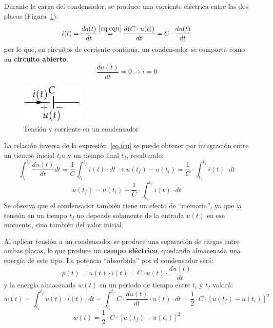 \documentclass[11pt]{book} %
\begin{document}
	Durante la carga del condensador, se produce una corriente eléctrica entre las dos placas (Figura~\ref{fig.condensador}): 
	\begin{equation*}\label{eq.icu}
		i(t)=\dfrac{dq(t)}{dt}\stackrel{\eqref{eq.cqu}}{=}\dfrac{d(C\cdot u(t))}{dt}=C\cdot \dfrac{du(t)}{dt}
	\end{equation*}
	por lo que, en circuitos de corriente continua, un condensador se comporta como un \textbf{circuito abierto}.
	\begin{equation*}
		\frac{du(t)}{dt} = 0 \rightarrow i = 0
	\end{equation*}
	\begin{figure}[htbp]
		\centering
		\includegraphics[width=0.15\linewidth]{../figs/Condensador.pdf}
		\caption{Tensión y corriente en un condensador}
		\label{fig.condensador}
	\end{figure}
	
	La relación inversa de la expresión~\eqref{eq.icu} se puede obtener por integración entre un tiempo inicial $t_iu$ y un tiempo final $t_f$, resultando:
	\begin{equation*}
		\int_{t_i}^{t_f} \dfrac{du(t)}{dt}dt=\dfrac{1}{C}\int_{t_i}^{t_f}i(t)\cdot dt \rightarrow u(t_f)-u(t_i)=\dfrac{1}{C}\cdot\int_{t_i}^{t_f} i(t)\cdot dt
	\end{equation*}
	\begin{equation}\label{eq.u_C}
		\boxed{u(t_f)=u(t_i)+\dfrac{1}{C}\cdot\int_{t_i}^{t_f} i(t)\cdot dt}
	\end{equation}
	Se observa que el condensador también tiene un efecto de ``memoria'', ya que la tensión en un tiempo $t_f$ no depende solamente de la entrada $u(t)$ en ese momento, sino también del valor inicial.
	
	Al aplicar tensión a un condensador se produce una separación de cargas entre ambas placas, lo que produce un \textbf{campo eléctrico}, quedando almacenada una energía de este tipo. La potencia ``absorbida'' por el condensador será:
	\begin{equation*}
		p(t)=u(t)\cdot i(t)=C\cdot u(t)\cdot\dfrac{du(t)}{dt}
	\end{equation*}
	y la energía almacenada $w(t)$ en un periodo de tiempo entre $t_i$ y $t_f$ valdrá:
	\begin{equation*}
		w(t)=\int_{t_i}^{t_f}v(t)\cdot i(t)\cdot dt=\int_{t_i}^{t_f}C\cdot\dfrac{du(t)}{dt}\cdot u(t)\cdot dt=\dfrac{1}{2}\cdot C\cdot [u(t_f)-u(t_i)]^2
	\end{equation*}
	\begin{equation}
		\boxed{w(t)=\dfrac{1}{2}\cdot C\cdot [u(t_f)-u(t_i)]^2}
	\end{equation}
	
\end{document}
